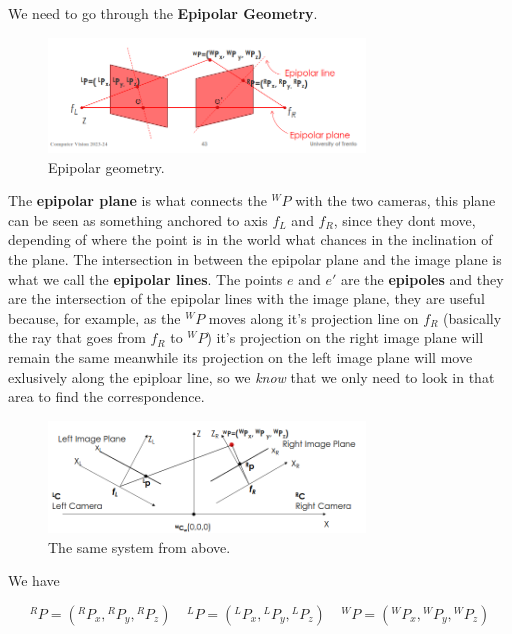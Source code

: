 We need to go through the \textbf{Epipolar Geometry}.

\begin{figure}[H]
    \centering
    \includegraphics[width=0.75\textwidth]{Figures/epipolar.png}
    \caption{Epipolar geometry.}
    \label{fig:epipolar}
\end{figure}

The \textbf{epipolar plane} is what connects the  \({}^WP\) with the two cameras, this plane can be seen as something anchored to axis \(f_L\) and \(f_R\), since they dont move, depending of where the point is in the world what chances in the inclination of the plane. The intersection in between the epipolar plane and the image plane is what we call the \textbf{epipolar lines}. The points \(e\) and \(e'\) are the \textbf{epipoles} and they are the intersection of the epipolar lines with the image plane, they are useful because, for example, as the \({}^WP\) moves along it's projection line on \(f_R\) (basically the ray that goes from \(f_R\) to \({}^WP\)) it's projection on the right image plane will remain the same meanwhile its projection on the left image plane will move exlusively along the epiploar line, so we \textit{know} that we only need to look in that area to find the correspondence. 

\begin{figure}[H]
    \centering
    \includegraphics[width=0.75\textwidth]{Figures/epipolar_above.png}
    \caption{The same system from above.}
    \label{fig:epipolar_above}
\end{figure}

We have 


\[{}^RP = ({}^RP_x, {}^RP_y, {}^RP_z) \;\;\;\;
{}^LP = ({}^LP_x, {}^LP_y, {}^LP_z)\;\;\;\;
{}^WP = ({}^WP_x, {}^WP_y, {}^WP_z)\]


